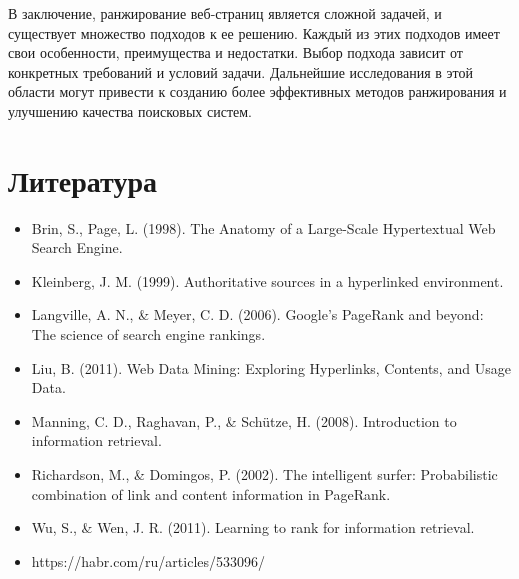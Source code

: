 \documentclass[a4paper]{article}
\begin{document}
	В заключение, ранжирование веб-страниц является сложной задачей, и существует множество подходов к ее решению. Каждый из этих подходов имеет свои особенности, преимущества и недостатки. Выбор подхода зависит от конкретных требований и условий задачи. Дальнейшие исследования в этой области могут привести к созданию более эффективных методов ранжирования и улучшению качества поисковых систем.

\newpage
\section{Литература}	
\begin{itemize}
	\item Brin, S., Page, L. (1998). The Anatomy of a Large-Scale Hypertextual Web Search Engine.
	\item Kleinberg, J. M. (1999). Authoritative sources in a hyperlinked environment.
	\item Langville, A. N., \& Meyer, C. D. (2006). Google's PageRank and beyond: The science of search engine rankings.
	\item Liu, B. (2011). Web Data Mining: Exploring Hyperlinks, Contents, and Usage Data.
	\item Manning, C. D., Raghavan, P., \& Schütze, H. (2008). Introduction to information retrieval.
	\item Richardson, M., \& Domingos, P. (2002). The intelligent surfer: Probabilistic combination of link and content information in PageRank.
	\item Wu, S., \& Wen, J. R. (2011). Learning to rank for information retrieval.
	\item https://habr.com/ru/articles/533096/
\end{itemize}
	
	
\end{document}
